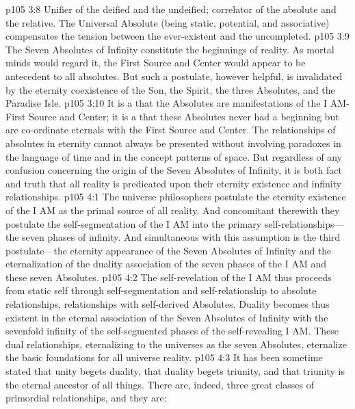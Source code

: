 \pc \vs p105 3:8 \bibnobreakspace {} Unifier of the deified and the undeified; correlator of the absolute and the relative. The Universal Absolute (being static, potential, and associative) compensates the tension between the ever\hyp{}existent and the uncompleted.
\pc \vs p105 3:9 The Seven Absolutes of Infinity constitute the beginnings of reality. As mortal minds would regard it, the First Source and Center would appear to be antecedent to all absolutes. But such a postulate, however helpful, is invalidated by the eternity coexistence of the Son, the Spirit, the three Absolutes, and the Paradise Isle.
\vs p105 3:10 It is a  that the Absolutes are manifestations of the I AM\hyp{}First Source and Center; it is a  that these Absolutes never had a beginning but are co\hyp{}ordinate eternals with the First Source and Center. The relationships of absolutes in eternity cannot always be presented without involving paradoxes in the language of time and in the concept patterns of space. But regardless of any confusion concerning the origin of the Seven Absolutes of Infinity, it is both fact and truth that all reality is predicated upon their eternity existence and infinity relationships.\plusone
{}
\vs p105 4:1 The universe philosophers postulate the eternity existence of the I AM as the primal source of all reality. And concomitant therewith they postulate the self\hyp{}segmentation of the I AM into the primary self\hyp{}relationships---the seven phases of infinity. And simultaneous with this assumption is the third postulate---the eternity appearance of the Seven Absolutes of Infinity and the eternalization of the duality association of the seven phases of the I AM and these seven Absolutes.
\vs p105 4:2 The self\hyp{}revelation of the I AM thus proceeds from static self through self\hyp{}segmentation and self\hyp{}relationship to absolute relationships, relationships with self\hyp{}derived Absolutes. Duality becomes thus existent in the eternal association of the Seven Absolutes of Infinity with the sevenfold infinity of the self\hyp{}segmented phases of the self\hyp{}revealing I AM. These dual relationships, eternalizing to the universes as the seven Absolutes, eternalize the basic foundations for all universe reality.
\vs p105 4:3 It has been sometime stated that unity begets duality, that duality begets triunity, and that triunity is the eternal ancestor of all things. There are, indeed, three great classes of primordial relationships, and they are:
